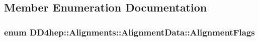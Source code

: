 \subsection{Member Enumeration Documentation}
\hypertarget{class_d_d4hep_1_1_alignments_1_1_alignment_data_a3fb06356abe173269ebc8fd920758357}{
\subsubsection[{AlignmentFlags}]{\setlength{\rightskip}{0pt plus 5cm}enum {\bf DD4hep::Alignments::AlignmentData::AlignmentFlags}}}
\label{class_d_d4hep_1_1_alignments_1_1_alignment_data_a3fb06356abe173269ebc8fd920758357}
